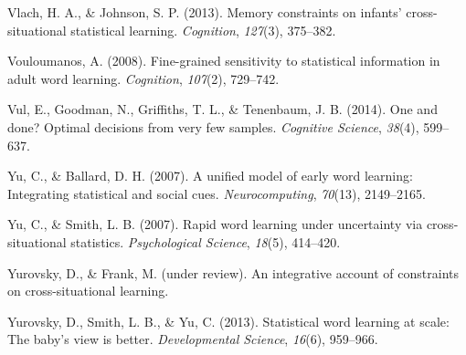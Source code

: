 \documentclass[12pt,]{article}
\begin{document}
Vlach, H. A., \& Johnson, S. P. (2013). Memory constraints on infants'
cross-situational statistical learning. \emph{Cognition}, \emph{127}(3),
375--382.

Vouloumanos, A. (2008). Fine-grained sensitivity to statistical
information in adult word learning. \emph{Cognition}, \emph{107}(2),
729--742.

Vul, E., Goodman, N., Griffiths, T. L., \& Tenenbaum, J. B. (2014). One
and done? Optimal decisions from very few samples. \emph{Cognitive
Science}, \emph{38}(4), 599--637.

Yu, C., \& Ballard, D. H. (2007). A unified model of early word
learning: Integrating statistical and social cues.
\emph{Neurocomputing}, \emph{70}(13), 2149--2165.

Yu, C., \& Smith, L. B. (2007). Rapid word learning under uncertainty
via cross-situational statistics. \emph{Psychological Science},
\emph{18}(5), 414--420.

Yurovsky, D., \& Frank, M. (under review). An integrative account of
constraints on cross-situational learning.

Yurovsky, D., Smith, L. B., \& Yu, C. (2013). Statistical word learning
at scale: The baby's view is better. \emph{Developmental Science},
\emph{16}(6), 959--966.
\end{document}
